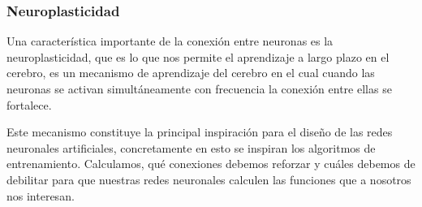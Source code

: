 \subsubsection{Neuroplasticidad}

Una característica importante de la conexión entre neuronas es la neuroplasticidad, que es lo que nos permite el aprendizaje a largo plazo en el cerebro, es un mecanismo de aprendizaje del cerebro en el cual cuando las neuronas se activan simultáneamente con frecuencia la conexión entre ellas se fortalece.


Este mecanismo constituye la principal inspiración para el diseño de las redes neuronales artificiales, concretamente en esto se inspiran los algoritmos de entrenamiento. Calculamos, qué conexiones debemos reforzar y cuáles debemos de debilitar para que nuestras redes neuronales calculen las funciones que a nosotros nos interesan. 






